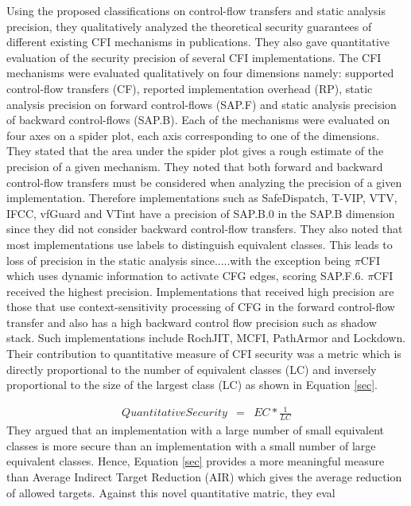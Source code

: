 \documentclass[dvips,12pt]{article}
\begin{document}
Using the proposed classifications on control-flow transfers and static analysis precision, they qualitatively analyzed the theoretical security guarantees of different existing CFI mechanisms in publications. They also gave quantitative evaluation of the security precision of several CFI implementations. The CFI mechanisms were evaluated qualitatively on four dimensions namely: supported control-flow transfers (CF), reported implementation overhead (RP), static analysis precision on forward control-flows (SAP.F) and static analysis precision of backward control-flows (SAP.B). Each of the mechanisms were evaluated on four axes on a spider plot, each axis corresponding to one of the dimensions. They stated that the area under the spider plot gives a rough estimate of the precision of a given mechanism. They noted that both forward and backward control-flow transfers must be considered when analyzing the precision of a given implementation. Therefore implementations such as SafeDispatch, T-VIP, VTV, IFCC, vfGuard and VTint have a precision of SAP.B.0 in the SAP.B dimension since they did not consider backward control-flow transfers. They also noted that most implementations use labels to distinguish equivalent classes. This leads to loss of precision in the static analysis since.....with the exception being $\pi$CFI which uses dynamic information to activate CFG edges, scoring SAP.F.6. $\pi$CFI received the highest precision. Implementations that received high precision are those that use context-sensitivity processing of CFG in the forward control-flow transfer and also has a high backward control flow precision such as shadow stack. Such implementations include RochJIT, MCFI, PathArmor and Lockdown. Their contribution to quantitative measure of CFI security was a metric which is directly proportional to the number of equivalent classes (LC) and inversely proportional to the size of the largest class (LC) as shown in Equation \ref{sec}. 

\begin{eqnarray}
QuantitativeSecurity &=& EC * \frac{1}{LC}
\label{sec}
\end{eqnarray}
\nolinebreak
They argued that an implementation with a large number of small equivalent classes is more secure than an implementation with a small number of large equivalent classes. Hence, Equation \ref{sec} provides a more meaningful measure than Average Indirect Target Reduction (AIR) which gives the average reduction of allowed targets. Against this novel quantitative matric, they eval
\newline
\newline
\end{document}
